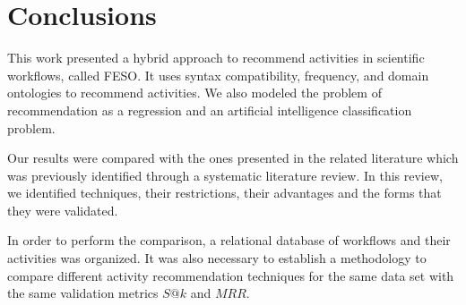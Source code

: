 \documentclass[10pt,letterpaper]{article}
\begin{document}
\section*{Conclusions}
%
%
%

This work presented a hybrid approach to recommend activities in scientific workflows, called FESO. It uses syntax compatibility, frequency, and domain ontologies to recommend activities. We also modeled the problem of recommendation as a regression and an artificial intelligence classification problem. 

Our results were compared with the ones presented in the related literature which was previously identified through a systematic literature review. In this review, we identified techniques, their restrictions, their advantages and the forms that they were validated. 

In order to perform the comparison, a relational database of workflows and their activities was organized. It was also necessary to establish a methodology to compare different activity recommendation techniques for the same data set with the same validation metrics \(S@k\) and \(MRR\).
\end{document}
